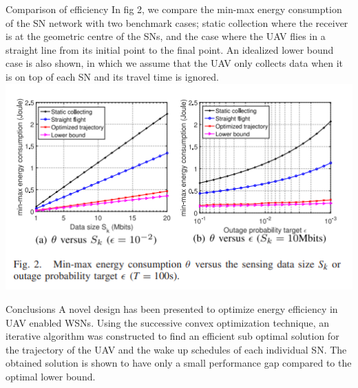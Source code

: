 \documentclass{beamer}
\begin{document}
\begin{frame}{Comparison of efficiency}
In fig 2, we compare the min-max energy consumption of the SN network with two benchmark cases; static collection where the receiver is at the geometric centre of the SNs, and the case where the UAV flies in a straight line from its initial point to the final point. An idealized lower bound case is also shown, in which we assume that the UAV only collects data when it is on top of each SN and its travel time is ignored. 
\includegraphics[]{fig2.png}
    
\end{frame}
\begin{frame}{Conclusions}
A novel design has been presented to optimize energy efficiency in UAV enabled WSNs. Using the successive convex optimization technique, an iterative algorithm was constructed to find an efficient sub optimal solution for the trajectory of the UAV and the wake up schedules of each individual SN. The obtained solution is shown to have only a small performance gap compared to the optimal lower bound. 
    
\end{frame}
\end{document}
